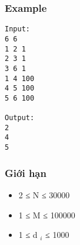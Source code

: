 \subsubsection{   Example  }
\begin{verbatim}
Input:
6 6
1 2 1
2 3 1
3 6 1
1 4 100
4 5 100
5 6 100

Output:
2
4 
5

\end{verbatim}

\subsubsection{   Giới hạn  }
\begin{itemize}
	\item     2 ≤ N ≤ 30000   
	\item     1 ≤ M ≤ 100000   
	\item     1 ≤ d    $_     i    $    ≤ 1000   
\end{itemize}